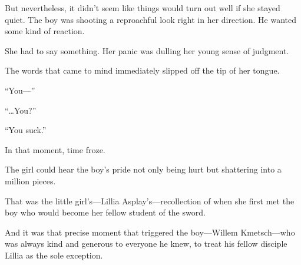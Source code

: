 But nevertheless, it didn’t seem like things would turn out well if she stayed quiet. The boy was shooting a reproachful look right in her direction. He wanted some kind of reaction.

She had to say something. Her panic was dulling her young sense of judgment.

The words that came to mind immediately slipped off the tip of her tongue.

“You—”

“…You?”

“You suck.”

In that moment, time froze.

The girl could hear the boy’s pride not only being hurt but shattering into a million pieces.

That was the little girl’s—Lillia Asplay’s—recollection of when she first met the boy who would become her fellow student of the sword.

And it was that precise moment that triggered the boy—Willem Kmetsch—who was always kind and generous to everyone he knew, to treat his fellow disciple Lillia as the sole exception.